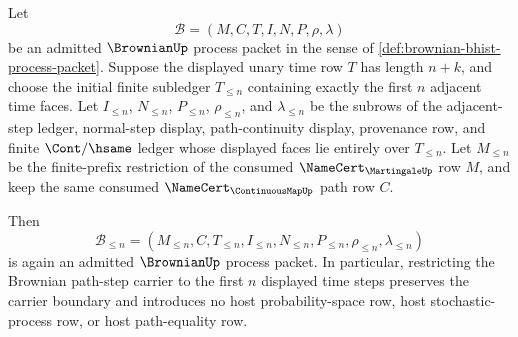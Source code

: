 \begin{theorem}
\label{thm:brownian-finite-prefix-carrier-restriction}
Let
$$
\mathcal{B}=(M,C,T,I,N,P,\rho,\lambda)
$$
be an admitted $\BrownianUp$ process packet in the sense of
\autoref{def:brownian-bhist-process-packet}. Suppose the displayed unary time
row $T$ has length $n+k$, and choose the initial finite subledger $T_{\leq n}$
containing exactly the first $n$ adjacent time faces. Let $I_{\leq n}$,
$N_{\leq n}$, $P_{\leq n}$, $\rho_{\leq n}$, and $\lambda_{\leq n}$ be the
subrows of the adjacent-step ledger, normal-step display, path-continuity
display, provenance row, and finite $\Cont/\hsame$ ledger whose displayed
faces lie entirely over $T_{\leq n}$. Let $M_{\leq n}$ be the finite-prefix
restriction of the consumed $\NameCert_{\MartingaleUp}$ row $M$, and keep the
same consumed $\NameCert_{\ContinuousMapUp}$ path row $C$.

Then
$$
\mathcal{B}_{\leq n}=(M_{\leq n},C,T_{\leq n},I_{\leq n},N_{\leq n},P_{\leq n},\rho_{\leq n},\lambda_{\leq n})
$$
is again an admitted $\BrownianUp$ process packet. In particular, restricting
the Brownian path-step carrier to the first $n$ displayed time steps preserves
the carrier boundary and introduces no host probability-space row, host
stochastic-process row, or host path-equality row.
\end{theorem}
